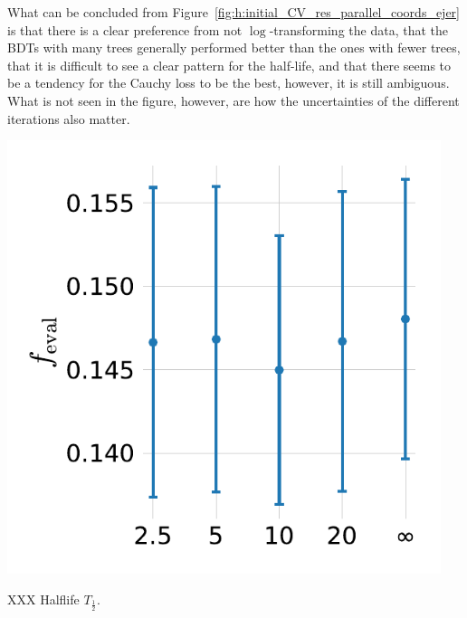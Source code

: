 What can be concluded from Figure~\ref{fig:h:initial_CV_res_parallel_coords_ejer} is that there is a clear preference from not $\log$-transforming the data, that the BDTs with many trees generally performed better than the ones with fewer trees, that it is difficult to see a clear pattern for the half-life, and that there seems to be a tendency for the Cauchy loss to be the best, however, it is still ambiguous. What is not seen in the figure, however, are how the uncertainties of the different iterations also matter. 
\begin{marginfigure}[1cm]
  \centerfloat
  \includegraphics[width=0.95\textwidth, trim=0 0 0 0, clip]{figures/housing/Ejerlejlighed_v19_cut_all_Ncols_all_MAD_gridsearch_half.pdf}
  \caption[XXX]
          {XXX Halflife $T_{\frac{1}{2}}$.
          }
  \label{fig:h:hpo_gridsearch_objective}
\end{marginfigure}

